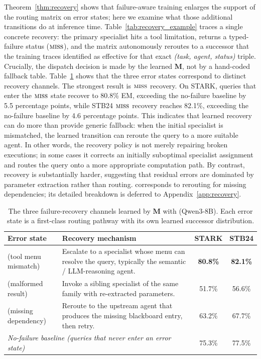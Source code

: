 Theorem~\ref{thm:recovery} shows that failure-aware training enlarges the support of the routing matrix on error states; here we examine what those additional transitions do at inference time.
Table~\ref{tab:recovery_example} traces a single concrete recovery: the primary specialist hits a tool limitation, returns a typed-failure status ($\textnormal{\textsc{miss}}$), and the matrix autonomously reroutes to a successor that the training traces identified as effective for that exact \emph{(task, agent, status)} triple. Crucially, the dispatch decision is made by the learned $\mathbf{M}$, not by a hand-coded fallback table.
Table~\ref{tab:recovery_pathways} shows that the three error states correspond to distinct recovery channels.
The strongest result is $\textnormal{\textsc{miss}}$ recovery.
On STARK, queries that enter the $\textnormal{\textsc{miss}}$ state recover to 80.8\% EM, exceeding the no-failure baseline by 5.5 percentage points, while STB24 $\textnormal{\textsc{miss}}$ recovery reaches 82.1\%, exceeding the no-failure baseline by 4.6 percentage points.
This indicates that learned recovery can do more than provide generic fallback: when the initial specialist is mismatched, the learned transition can reroute the query to a more suitable agent. In other words, the recovery policy is not merely repairing broken executions; in some cases it corrects an initially suboptimal specialist assignment and routes the query onto a more appropriate computation path.
By contrast, \sfail{} recovery is substantially harder, suggesting that residual errors are dominated by parameter extraction rather than routing.
\sblock{} corresponds to rerouting for missing dependencies; its detailed breakdown is deferred to Appendix~\ref{app:recovery}.

\begin{table}[!htbp]
\centering
\caption{The three failure-recovery channels learned by $\mathbf{M}$ with (Qwen3-8B).  Each error state is a first-class routing pathway with its own learned successor distribution.}
\label{tab:recovery_pathways}
\small
\begin{tabular}{l p{4.6cm} c c}
\toprule
Error state & Recovery mechanism & STARK & STB24 \\
\midrule
\smiss{} (tool menu mismatch) & Escalate to a specialist whose menu can resolve the query, typically the semantic / LLM-reasoning agent. & \textbf{80.8\%} & \textbf{82.1\%} \\
\sfail{} (malformed result)   & Invoke a sibling specialist of the same family with re-extracted parameters.                       & 51.7\% & 56.6\% \\
\sblock{} (missing dependency) & Reroute to the upstream agent that produces the missing blackboard entry, then retry.            & 63.2\% & 67.7\% \\
\midrule
\multicolumn{2}{l}{\emph{No-failure baseline (queries that never enter an error state)}} & 75.3\% & 77.5\% \\
\bottomrule
\end{tabular}
\end{table}

